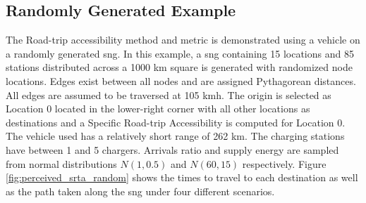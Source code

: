 \documentclass[11pt]{article}
\begin{document}
\begin{multicols}{2}
\subsection*{Randomly Generated Example}

The Road-trip accessibility method and metric is demonstrated using a vehicle on a randomly generated \gls{sng}. In this example, a \gls{sng} containing 15 locations and 85 stations distributed across a 1000 km square is generated with randomized node locations. Edges exist between all nodes and are assigned Pythagorean distances. All edges are assumed to be traversed at 105 kmh. The origin is selected as Location 0 located in the lower-right corner with all other locations as destinations and a Specific Road-trip Accessibility is computed for Location 0. The vehicle used has a relatively short range of 262 km. The charging stations have between 1 and 5 chargers. Arrivals ratio and supply energy are sampled from normal distributions $N(1, 0.5)$ and $N(60, 15)$ respectively. Figure \ref{fig:perceived_srta_random} shows the times to travel to each destination as well as the path taken along the \gls{sng} under four different scenarios.


\end{multicols}
\end{document}
